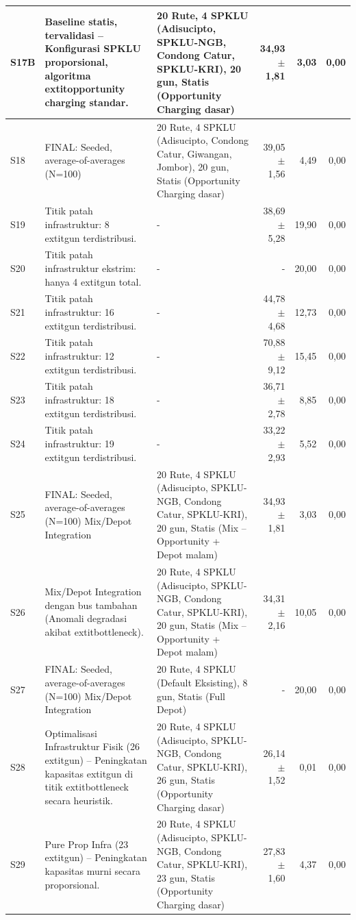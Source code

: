 \begin{center}
\begin{longtable}{|l|p{2.5cm}|p{2.5cm}|r|r|r|}
S17B & Baseline statis, tervalidasi -- Konfigurasi SPKLU proporsional, algoritma 	extit{opportunity charging} standar. & 20 Rute, 4 SPKLU (Adisucipto, SPKLU-NGB, Condong Catur, SPKLU-KRI), 20 gun, Statis (Opportunity Charging dasar) & 34,93 $\pm$ 1,81 & 3,03 & 0,00 \\ \hline
S18 & FINAL: Seeded, average-of-averages (N=100) & 20 Rute, 4 SPKLU (Adisucipto, Condong Catur, Giwangan, Jombor), 20 gun, Statis (Opportunity Charging dasar) & 39,05 $\pm$ 1,56 & 4,49 & 0,00 \\ \hline
S19 & Titik patah infrastruktur: 8 	extit{gun} terdistribusi. & - & 38,69 $\pm$ 5,28 & 19,90 & 0,00 \\ \hline
S20 & Titik patah infrastruktur ekstrim: hanya 4 	extit{gun} total. & - & - & 20,00 & 0,00 \\ \hline
S21 & Titik patah infrastruktur: 16 	extit{gun} terdistribusi. & - & 44,78 $\pm$ 4,68 & 12,73 & 0,00 \\ \hline
S22 & Titik patah infrastruktur: 12 	extit{gun} terdistribusi. & - & 70,88 $\pm$ 9,12 & 15,45 & 0,00 \\ \hline
S23 & Titik patah infrastruktur: 18 	extit{gun} terdistribusi. & - & 36,71 $\pm$ 2,78 & 8,85 & 0,00 \\ \hline
S24 & Titik patah infrastruktur: 19 	extit{gun} terdistribusi. & - & 33,22 $\pm$ 2,93 & 5,52 & 0,00 \\ \hline
S25 & FINAL: Seeded, average-of-averages (N=100) Mix/Depot Integration & 20 Rute, 4 SPKLU (Adisucipto, SPKLU-NGB, Condong Catur, SPKLU-KRI), 20 gun, Statis (Mix -- Opportunity + Depot malam) & 34,93 $\pm$ 1,81 & 3,03 & 0,00 \\ \hline
S26 & Mix/Depot Integration dengan bus tambahan (Anomali degradasi akibat 	extit{bottleneck}). & 20 Rute, 4 SPKLU (Adisucipto, SPKLU-NGB, Condong Catur, SPKLU-KRI), 20 gun, Statis (Mix -- Opportunity + Depot malam) & 34,31 $\pm$ 2,16 & 10,05 & 0,00 \\ \hline
S27 & FINAL: Seeded, average-of-averages (N=100) Mix/Depot Integration & 20 Rute, 4 SPKLU (Default Eksisting), 8 gun, Statis (Full Depot) & - & 20,00 & 0,00 \\ \hline
S28 & Optimalisasi Infrastruktur Fisik (26 	extit{gun}) -- Peningkatan kapasitas 	extit{gun} di titik 	extit{bottleneck} secara heuristik. & 20 Rute, 4 SPKLU (Adisucipto, SPKLU-NGB, Condong Catur, SPKLU-KRI), 26 gun, Statis (Opportunity Charging dasar) & 26,14 $\pm$ 1,52 & 0,01 & 0,00 \\ \hline
S29 & Pure Prop Infra (23 	extit{gun}) -- Peningkatan kapasitas murni secara proporsional. & 20 Rute, 4 SPKLU (Adisucipto, SPKLU-NGB, Condong Catur, SPKLU-KRI), 23 gun, Statis (Opportunity Charging dasar) & 27,83 $\pm$ 1,60 & 4,37 & 0,00 \\ \hline

\end{longtable}
\end{center}
